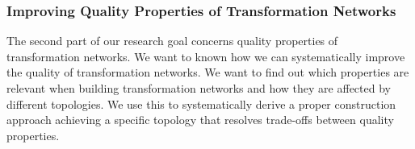 




\subsubsection*{Improving Quality Properties of Transformation Networks}
The second part of our research goal concerns quality properties of transformation networks.
We want to known how we can systematically improve the quality of transformation networks. We want to find out which properties are relevant when building transformation networks and how they are affected by different topologies. 
We use this to systematically derive a proper construction approach achieving a specific topology that resolves trade-offs between quality properties. 

